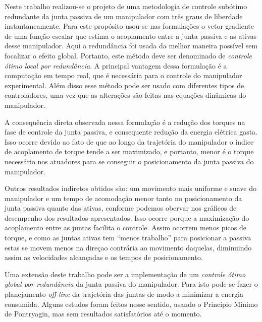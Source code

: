 
Neste trabalho realizou-se o projeto de uma metodologia de controle subótimo redundante da junta passiva de um manipulador com três graus de liberdade instantaneamente. Para este propósito usou-se nas formulações o vetor gradiente de uma função escalar que estima o acoplamento entre a junta passiva e as ativas desse manipulador. Aqui a redundância
foi usada da melhor maneira possível sem focalizar o efeito global. Portanto, este método deve ser denominado de \emph{controle ótimo local por redundância}. A principal vantagem dessa formulação é a computação em tempo real, que é
necessária para o controle do manipulador experimental. Além disso esse método pode ser usado com diferentes tipos de controladores, uma vez que as alterações são feitas nas equações dinâmicas do manipulador.

A consequência direta observada nessa formulação é a redução dos torques na fase de controle da junta passiva, e consequente redução da energia elétrica gasta. Isso ocorre devido ao fato de que ao longo da trajetória do manipulador
o índice de acoplamento de torque tende a ser maximizado, e portanto, menor é o torque necessário nos atuadores para se conseguir o posicionamento da junta passiva do manipulador.

Outros resultados indiretos obtidos são: um movimento mais uniforme e suave do manipulador e um tempo de acomodação menor tanto no posicionamento da junta passiva quanto das ativas, conforme podemos obervar nos gráficos de desempenho dos resultados apresentados. Isso ocorre porque a maximização do acoplamento entre as juntas facilita o controle. Assim
ocorrem menos picos de torque, e como as juntas ativas tem ``menos trabalho'' para posicionar a passiva estas se movem menos na direçao contrária ao movimento daquelas, diminuindo assim as velocidades alcançadas e os tempos de posicionamento.

Uma extensão deste trabalho pode ser a implementação de um \emph{controle ótimo global por redundância} da junta passiva do manipulador. Para isto pode-se fazer o planejamento \emph{off-line} da trajetória das juntas de modo a minimizar a energia consumida. Alguns estudos foram feitos nesse sentido, usando o Princípio Mínimo de Pontryagin, mas sem resultados satisfatórios até o momento.
